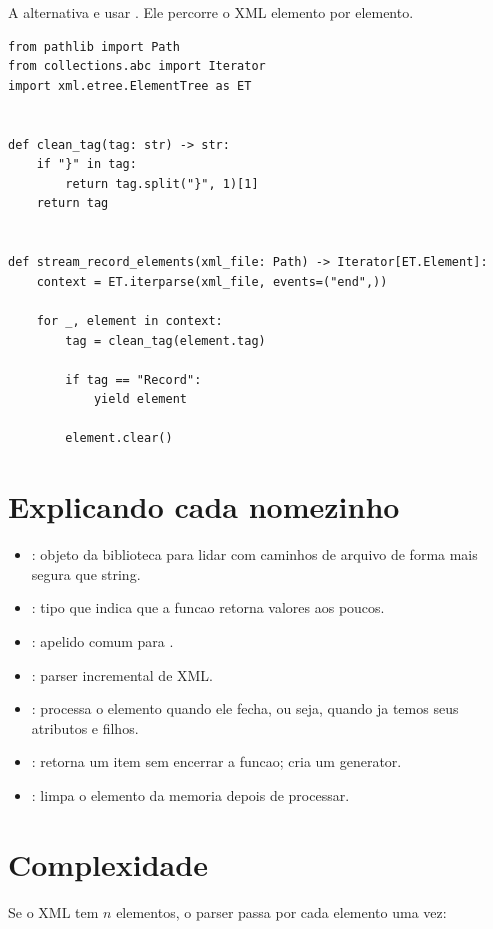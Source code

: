 A alternativa e usar . Ele percorre o XML elemento por elemento.

\begin{lstlisting}[style=devbutterpython]
from pathlib import Path
from collections.abc import Iterator
import xml.etree.ElementTree as ET


def clean_tag(tag: str) -> str:
    if "}" in tag:
        return tag.split("}", 1)[1]
    return tag


def stream_record_elements(xml_file: Path) -> Iterator[ET.Element]:
    context = ET.iterparse(xml_file, events=("end",))

    for _, element in context:
        tag = clean_tag(element.tag)

        if tag == "Record":
            yield element

        element.clear()
\end{lstlisting}

\section{Explicando cada nomezinho}

\begin{itemize}
  \item {}: objeto da biblioteca  para lidar com caminhos de arquivo de forma mais segura que string.
  \item {}: tipo que indica que a funcao retorna valores aos poucos.
  \item {}: apelido comum para .
  \item {}: parser incremental de XML.
  \item {}: processa o elemento quando ele fecha, ou seja, quando ja temos seus atributos e filhos.
  \item {}: retorna um item sem encerrar a funcao; cria um generator.
  \item {}: limpa o elemento da memoria depois de processar.
\end{itemize}

\section{Complexidade}

Se o XML tem \(n\) elementos, o parser passa por cada elemento uma vez:


